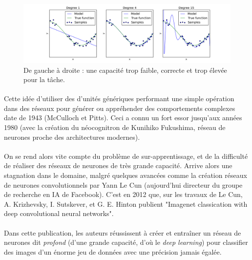 \documentclass[a4paper,10pt]{article}
\begin{document}
                \begin{figure}[h!]
                    \centering
                    \includegraphics[width=\textwidth]{plot_underfitting_overfitting_0011.png}
                    \caption{De gauche à droite : une capacité trop faible, correcte et trop élevée pour la tâche.}
                    \label{fig:overfit}
                \end{figure}
                
                
                \paragraph{}
                    Cette idée d'utiliser des d'unités génériques performant une simple opération dans 
                    des réseaux pour générer ou appréhender des comportements complexes date de 1943 
                    (McCulloch et Pitts). Ceci a connu un fort essor jusqu'aux années 1980 (avec la 
                    création du néocognitron de Kunihiko Fukushima, réseau de neurones proche des 
                    architectures modernes). 
                    
                \paragraph{}
                    On se rend alors vite compte du problème de sur-apprentissage, et de la 
                    difficulté de réaliser des réseaux de neurones de très grande capacité. 
                    Arrive alors une stagnation dans le domaine, malgré quelques avancées 
                    comme la création réseaux de neurones convolutionnels par Yann Le Cun
                    (aujourd'hui directeur du groupe de recherche en IA de Facebook). 
                    C'est en 2012 que, sur les travaux de Le Cun,  A. Krizhevsky, I. Sutskever, et G. E. Hinton
                    publient "Imagenet classication with deep convolutional neural networks". 

                \paragraph{}
                    Dans cette publication, les auteurs réussissent à créer et entraîner un réseau 
                    de neurones dit \textit{profond} (d'une grande capacité, d'où le \textit{deep learning}) 
                    pour classifier des images d'un énorme jeu de données avec une précision 
                    jamais égalée. 
                    
\end{document}
